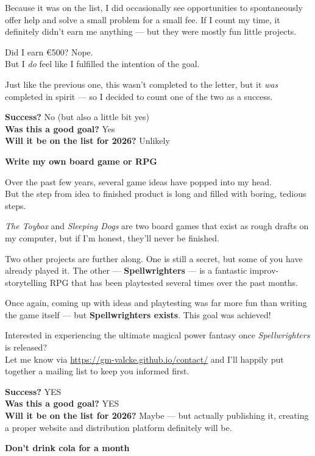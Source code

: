 \documentclass[12pt]{article}
\begin{document}
Because it was on the list, I did occasionally see opportunities to
spontaneously offer help and solve a small problem for a small fee. If I
count my time, it definitely didn't earn me anything --- but they were
mostly fun little projects.

Did I earn €500? Nope.\\
But I \emph{do} feel like I fulfilled the intention of the goal.

Just like the previous one, this wasn't completed to the letter, but it
\emph{was} completed in spirit --- so I decided to count one of the two
as a success.

\textbf{Success?} No (but also a little bit yes)\\
\textbf{Was this a good goal?} Yes\\
\textbf{Will it be on the list for 2026?} Unlikely

\textbf{Write my own board game or RPG}

Over the past few years, several game ideas have popped into my head.\\
But the step from idea to finished product is long and filled with
boring, tedious steps.

\emph{The Toybox} and \emph{Sleeping Dogs} are two board games that
exist as rough drafts on my computer, but if I'm honest, they'll never
be finished.

Two other projects are further along. One is still a secret, but some of
you have already played it. The other --- \textbf{Spellwrighters} --- is
a fantastic improv-storytelling RPG that has been playtested several
times over the past months.

Once again, coming up with ideas and playtesting was far more fun than
writing the game itself --- but \textbf{Spellwrighters exists}. This
goal was achieved!

Interested in experiencing the ultimate magical power fantasy once
\emph{Spellwrighters} is released?\\
Let me know via \url{https://gm-valcke.github.io/contact/} and I'll
happily put together a mailing list to keep you informed first.

\textbf{Success?} YES\\
\textbf{Was this a good goal?} YES\\
\textbf{Will it be on the list for 2026?} Maybe --- but actually
publishing it, creating a proper website and distribution platform
definitely will be.

\textbf{Don't drink cola for a month}
\end{document}
